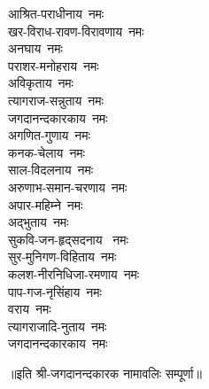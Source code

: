 \begin{flushleft}
\begin{multicols}{2}
आश्रित-पराधीनाय~नमः\\
खर-विराध-रावण-विरावणाय~नमः\\
अनघाय~नमः\\
पराशर-मनोहराय~नमः\\
अविकृताय~नमः\\
त्यागराज-सन्नुताय~नमः\\
जगदानन्दकारकाय~नमः\\
अगणित-गुणाय~नमः\\
कनक-चेलाय~नमः\\
साल-विदलनाय~नमः\hfill{}\\
अरुणाभ-समान-चरणाय~नमः\\
अपार-महिम्ने~नमः\\
अद्भुताय~नमः\\
सुकवि-जन-हृद्सदनाय ~नमः\\
सुर-मुनिगण-विहिताय~नमः\\
कलश-नीरनिधिजा-रमणाय~नमः\\
पाप-गज-नृसिंहाय~नमः\\
वराय~नमः\\
त्यागराजादि-नुताय~नमः\\
जगदानन्दकारकाय~नमः\hfill{}\\
\end{multicols}
\end{flushleft}
॥इति श्री-जगदानन्दकारक नामावलिः सम्पूर्णा॥

